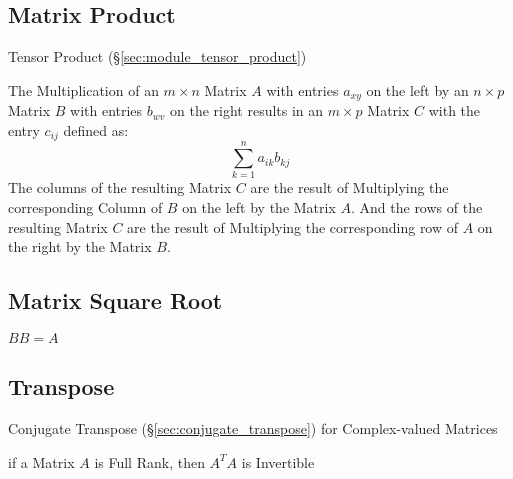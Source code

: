 \subsection{Matrix Product}\label{sec:matrix_product}

\fist Tensor Product (\S\ref{sec:module_tensor_product})

The Multiplication of an $m \times n$ Matrix $A$ with entries $a_{xy}$
on the left by an $n \times p$ Matrix $B$ with entries $b_{wv}$ on the
right results in an $m \times p$ Matrix $C$ with the entry $c_{ij}$
defined as:
\[
  \sum_{k=1}^n a_{ik} b_{kj}
\]
The columns of the resulting Matrix $C$ are the result of Multiplying
the corresponding Column of $B$ on the left by the Matrix $A$. And the
rows of the resulting Matrix $C$ are the result of Multiplying the
corresponding row of $A$ on the right by the Matrix $B$.



\subsection{Matrix Square Root}\label{sec:matrix_square_root}

$BB = A$



\subsection{Transpose}\label{sec:transpose}

Conjugate Transpose (\S\ref{sec:conjugate_transpose}) for Complex-valued
Matrices

if a Matrix $A$ is Full Rank, then $A^TA$ is Invertible

